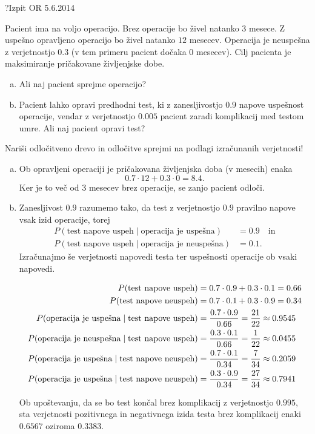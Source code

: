 \begin{naloga}{?}{Izpit OR 5.6.2014}
\begin{vprasanje}
Pacient ima na voljo operacijo.
Brez operacije bo živel natanko $3$ mesece.
Z uspeš\-no opravljeno operacijo bo živel natanko $12$ mesecev.
Operacija je neuspešna z verjetnostjo $0.3$
(v tem primeru pacient dočaka $0$ mesecev).
Cilj pacienta je maksimiranje pričakovane življenjske dobe.
\begin{enumerate}[(a)]
\item Ali naj pacient sprejme operacijo?
\item Pacient lahko opravi predhodni test,
ki z zanesljivostjo $0.9$ napove uspeš\-nost operacije,
vendar z verjetnostjo $0.005$ pacient zaradi komplikacij med testom umre.
Ali naj pacient opravi test?
\end{enumerate}
Nariši odločitveno drevo
in odločitve sprejmi na podlagi izračunanih ve\-rjet\-no\-sti!
\end{vprasanje}

\begin{odgovor}
\begin{enumerate}[(a)]
\item Ob opravljeni operaciji
je pričakovana življenjska doba (v mesecih) enaka
$$
0.7 \cdot 12 + 0.3 \cdot 0 = 8.4 .
$$
Ker je to več od $3$ mesecev brez operacije, se zanjo pacient odloči.

\item Zanesljivost $0.9$ razumemo tako,
da test z verjetnostjo $0.9$ pravilno napove vsak izid operacije,
torej
\begin{align*}
P(\text{test napove uspeh} \;|\; \text{operacija je uspešna}) &= 0.9
\quad \text{in} \\
P(\text{test napove uspeh} \;|\; \text{operacija je neuspešna}) &= 0.1 .
\end{align*}
Izračunajmo še verjetnosti napovedi testa
ter uspešnosti operacije ob vsaki napovedi.
\begin{small}
\begin{align*}
P(\text{test napove uspeh}) &= 0.7 \cdot 0.9 + 0.3 \cdot 0.1 = 0.66 \\
P(\text{test napove neuspeh}) &= 0.7 \cdot 0.1 + 0.3 \cdot 0.9 = 0.34 \\
P(\text{operacija je uspešna} \;|\; \text{test napove uspeh})
&= {0.7 \cdot 0.9 \over 0.66} = {21 \over 22} \approx 0.9545 \\
P(\text{operacija je neuspešna} \;|\; \text{test napove uspeh})
&= {0.3 \cdot 0.1 \over 0.66} = {1 \over 22} \approx 0.0455 \\
P(\text{operacija je uspešna} \;|\; \text{test napove neuspeh})
&= {0.7 \cdot 0.1 \over 0.34} = {7 \over 34} \approx 0.2059 \\
P(\text{operacija je uspešna} \;|\; \text{test napove neuspeh})
&= {0.3 \cdot 0.9 \over 0.34} = {27 \over 34} \approx 0.7941
\end{align*}
\end{small}
Ob upoštevanju, da se bo test končal brez komplikacij z verjetnostjo $0.995$,
sta verjetnosti pozitivnega in negativnega izida testa brez komplikacij
enaki $0.6567$ oziroma $0.3383$.


\end{enumerate}
\end{odgovor}
\end{naloga}
